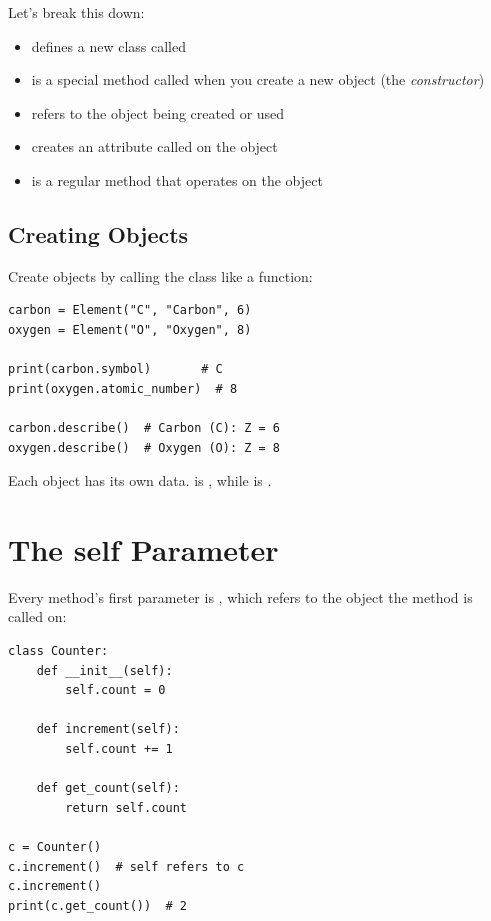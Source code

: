Let's break this down:

\begin{itemize}
    \item {} defines a new class called 
    \item {} is a special method called when you create a new object (the \emph{constructor})
    \item {} refers to the object being created or used
    \item {} creates an attribute called  on the object
    \item {} is a regular method that operates on the object
\end{itemize}

\subsection{Creating Objects}

Create objects by calling the class like a function:

\begin{lstlisting}
carbon = Element("C", "Carbon", 6)
oxygen = Element("O", "Oxygen", 8)

print(carbon.symbol)       # C
print(oxygen.atomic_number)  # 8

carbon.describe()  # Carbon (C): Z = 6
oxygen.describe()  # Oxygen (O): Z = 8
\end{lstlisting}

Each object has its own data.  is , while  is .

\section{The self Parameter}
\label{sec:self}

Every method's first parameter is , which refers to the object the method is called on:

\begin{lstlisting}
class Counter:
    def __init__(self):
        self.count = 0

    def increment(self):
        self.count += 1

    def get_count(self):
        return self.count

c = Counter()
c.increment()  # self refers to c
c.increment()
print(c.get_count())  # 2
\end{lstlisting}

